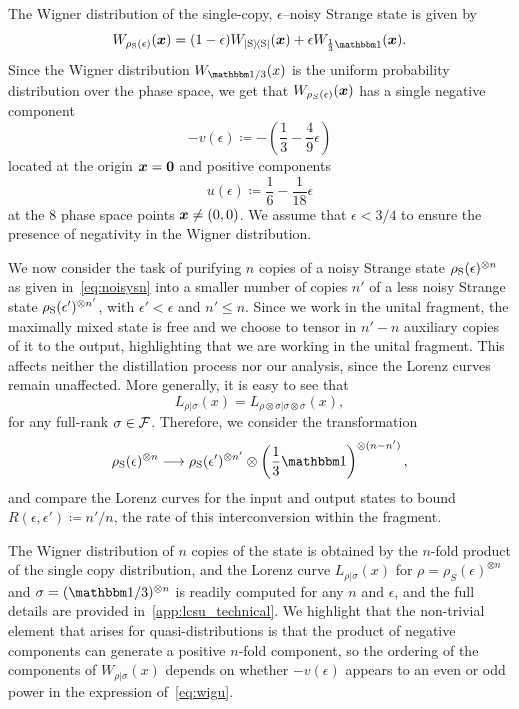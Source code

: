 \documentclass[pra,
aps,
twocolumn,
superscriptaddress,
groupedaddress,
nofootinbib,
reprint
]{revtex4-1}
\begin{document}
The Wigner distribution of the single-copy, $\epsilon$--noisy Strange state  is given by
\begin{equation}
	\W[\bmx]{\rho_{\rm{S}}(\epsilon)} = (1-\epsilon)\W[\bmx]{\ketbra{\rm{S}}} + \epsilon\W[\bmx]{\frac{1}{3}\id}.
\end{equation}
Since the Wigner distribution $W_{\I/3}(x)$ is the uniform probability distribution over the phase space, we get that $W_{\rho_S(\epsilon) } (\boldsymbol{x})$ has a single negative component
\begin{equation}
	- v(\epsilon) \coloneqq - \left( \frac{1}{3} -\frac{4}{9}\epsilon \right)
\end{equation} 
located at the origin $\bm{x} = \bm{0}$ and positive components
\begin{equation}
	u(\epsilon) \coloneqq \frac{1}{6} -\frac{1}{18}\epsilon
\end{equation}
at the 8 phase space points $\boldsymbol{x} \ne (0,0)$. We assume that $\epsilon < 3/4$ to ensure the presence of negativity in the Wigner distribution. 

We now consider the task of purifying $n$ copies of a noisy Strange state $\rho_{\rm{S}}(\epsilon)^{\otimes n}$ as given in~\cref{eq:noisysn} into a smaller number of copies $n'$ of a less noisy Strange state $\rho_{\rm{S}}(\epsilon')^{\otimes n'}$, with $\epsilon' < \epsilon$ and $n' \leq n$. Since we work in the unital fragment, the maximally mixed state is free and we choose to tensor in $n'-n$ auxiliary copies of it to the output, highlighting that we are working in the unital fragment. This affects neither the distillation process nor our analysis, since the Lorenz curves remain unaffected. More generally, it is easy to see that
\begin{equation}
	L_{\rho |\sigma} (x) = L_{\rho \otimes \sigma |\sigma \otimes \sigma}(x),
\end{equation}
for any full-rank $\sigma \in \mathcal{F}$. Therefore, we consider the transformation
\begin{equation}\label{eq:sudist}
	\rho_{\rm{S}}(\epsilon)^{\otimes n} \longrightarrow \rho_{\rm{S}}(\epsilon')^{\otimes n'} \otimes \left( \frac{1}{3}\id \right)^{\otimes (n-n')},
\end{equation}
and compare the Lorenz curves for the input and output states to bound $R(\epsilon, \epsilon') \coloneqq n'/n$, the rate of this interconversion within the fragment.

The Wigner distribution of $n$ copies of the state is obtained by the $n$-fold product of the single copy distribution, and the Lorenz curve $L_{\rho|\sigma}(x)$ for $\rho = \rho_S(\epsilon)^{\otimes n}$ and $\sigma = (\I/3)^{\otimes n}$ is readily computed for any $n$ and $\epsilon$, and the full details are provided in~\cref{app:lcsu_technical}.
We highlight that the non-trivial element that arises for quasi-distributions is that the product of negative components can generate a positive $n$-fold component, so the ordering of the components of $W_{\rho |\sigma}(x)$ depends on whether $-v(\epsilon)$ appears to an even or odd power in the expression of~\cref{eq:wigu}.
\end{document}
